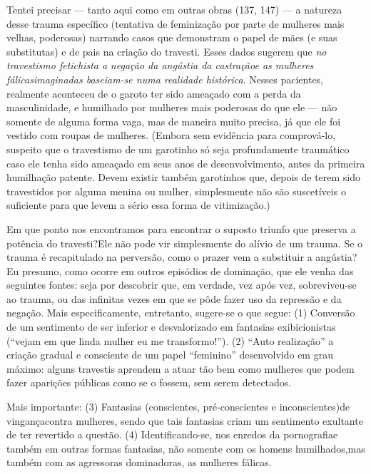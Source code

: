 Tentei precisar --- tanto aqui como em outras obras (137, 147) ---
a natureza desse trauma específico (tentativa de feminização por parte
de mulheres mais velhas, poderosas) narrando casos que demonstram o
papel de mães (e suas substitutas) e de pais\idxrelpctrav{} na criação do travesti.
Esses dados sugerem que \textit{no travestismo fetichista a}
\textit{negação da angústia da castração\idxtravemangu[|(] e as mulheres fálicas\idxmulhf[|(]
imaginadas baseiam-se numa realidade histórica}. Nesses pacientes,
realmente aconteceu de o garoto ter sido ameaçado com a perda da
masculinidade, e humilhado por mulheres mais poderosas do que ele ---
não somente de alguma forma vaga, mas de maneira muito precisa, já que
ele foi vestido com roupas de mulheres. (Embora sem evidência para
comprová-lo, suspeito que o travestismo de um garotinho só seja
profundamente traumático caso ele tenha sido ameaçado em seus anos de
desenvolvimento, antes da primeira humilhação patente. Devem existir
também garotinhos que, depois de terem sido travestidos por alguma
menina ou mulher, simplesmente não são suscetíveis o suficiente para
que levem a sério essa forma de vitimização.)\idxpornoviti[|(]

Em que ponto nos encontramos para encontrar o suposto triunfo\idxtraumatrav{} que
preserva a potência do travesti?\idxtravempote[|(] Ele não pode vir simplesmente do
alívio de um trauma. Se o trauma é recapitulado na perversão, como o
prazer vem a substituir a angústia? Eu presumo, como ocorre em outros
episódios de dominação, que ele venha das seguintes fontes: seja por
descobrir que, em verdade, vez após vez, sobreviveu-se ao trauma, ou
das infinitas vezes em que se pôde fazer uso da repressão e da negação.
Mais especificamente, entretanto, sugere-se o que segue: (1) Conversão
de um sentimento de ser inferior e desvalorizado em fantasias
exibicionistas\idxexibitrav{} (``vejam em que linda mulher eu me
transformo!''). (2) ``Auto
realização''\idxtravemauto{} a criação gradual e consciente de um papel
``feminino'' desenvolvido em grau máximo:
alguns travestis aprendem a atuar tão bem como mulheres que podem fazer
aparições públicas como se o fossem, sem serem detectados.

Mais importante: (3) Fantasias (conscientes, pré-conscientes e
inconscientes)\idxtravemving[|(] de vingança\idxvingatra[|(] contra mulheres, sendo que tais fantasias
criam um sentimento exultante de ter revertido a questão. (4)
Identificando-se, nos enredos da pornografia\idxpornofant[|(] e também em outras formas
fantasias, não somente com os homens humilhados,\idxtravetrau[|)] mas também com as
agressoras dominadoras, as mulheres fálicas.

